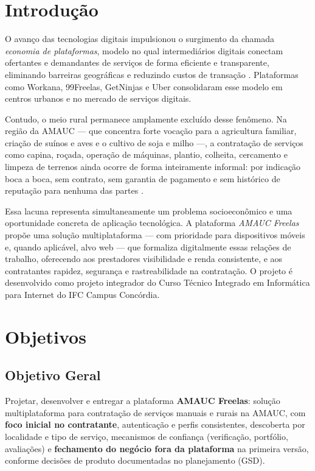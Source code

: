 \documentclass[12pt, a4paper]{article}
\begin{document}
\section{Introdução}

O avanço das tecnologias digitais impulsionou o surgimento da chamada
\textit{economia de plataformas}, modelo no qual intermediários digitais
conectam ofertantes e demandantes de serviços de forma eficiente e
transparente, eliminando barreiras geográficas e reduzindo custos de
transação \cite{workana, getninjas}. Plataformas como Workana,
99Freelas, GetNinjas e Uber consolidaram esse modelo em centros urbanos e
no mercado de serviços digitais.

Contudo, o meio rural permanece amplamente excluído desse fenômeno. Na
região da AMAUC --- que concentra forte vocação para a agricultura
familiar, criação de suínos e aves e o cultivo de soja e milho ---,
a contratação de serviços como capina, roçada, operação de máquinas,
plantio, colheita, cercamento e limpeza de terrenos ainda ocorre de
forma inteiramente informal: por indicação boca a boca, sem contrato,
sem garantia de pagamento e sem histórico de reputação para nenhuma das
partes \cite{ibge2019, sebrae2022}.

Essa lacuna representa simultaneamente um problema socioeconômico e uma
oportunidade concreta de aplicação tecnológica. A plataforma \textit{AMAUC Freelas}
propõe uma solução multiplataforma --- com prioridade para dispositivos móveis
e, quando aplicável, alvo web --- que formaliza
digitalmente essas relações de trabalho, oferecendo aos prestadores
visibilidade e renda consistente, e aos contratantes rapidez, segurança
e rastreabilidade na contratação. O projeto é desenvolvido como projeto
integrador do Curso Técnico Integrado em Informática para Internet do
IFC Campus Concórdia.

\section{Objetivos}

\subsection{Objetivo Geral}

Projetar, desenvolver e entregar a plataforma \textbf{AMAUC Freelas}:
solução multiplataforma para contratação de serviços manuais e rurais na
AMAUC, com \textbf{foco inicial no contratante}, autenticação e perfis
consistentes, descoberta por localidade e tipo de serviço, mecanismos de
confiança (verificação, portfólio, avaliações) e \textbf{fechamento do
negócio fora da plataforma} na primeira versão, conforme decisões de produto
documentadas no planejamento (GSD).
\end{document}
